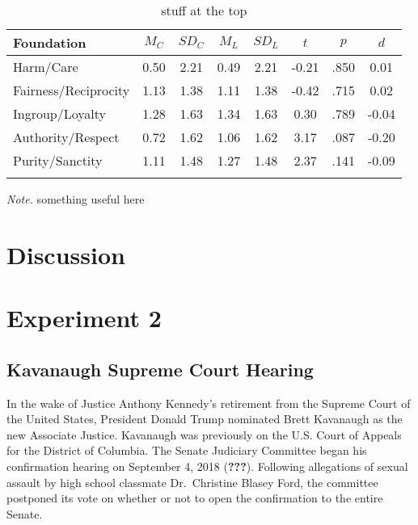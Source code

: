 \documentclass[,man]{apa6}
\theoremstyle{definition}
\theoremstyle{definition}
\theoremstyle{definition}
\theoremstyle{remark}
\begin{document}
\begin{table}[tbp]
\begin{center}
\begin{threeparttable}
\caption{\label{tab:exp1-table}stuff at the top}
\begin{tabular}{lccccccc}
\toprule
Foundation & $M_C$ & $SD_C$ & $M_L$ & $SD_L$ & $t$ & $p$ & $d$\\
\midrule
Harm/Care & 0.50 & 2.21 & 0.49 & 2.21 & -0.21 & .850 & 0.01\\
Fairness/Reciprocity & 1.13 & 1.38 & 1.11 & 1.38 & -0.42 & .715 & 0.02\\
Ingroup/Loyalty & 1.28 & 1.63 & 1.34 & 1.63 & 0.30 & .789 & -0.04\\
Authority/Respect & 0.72 & 1.62 & 1.06 & 1.62 & 3.17 & .087 & -0.20\\
Purity/Sanctity & 1.11 & 1.48 & 1.27 & 1.48 & 2.37 & .141 & -0.09\\
\bottomrule
\addlinespace
\end{tabular}
\begin{tablenotes}[para]
\normalsize{\textit{Note.} something useful here}
\end{tablenotes}
\end{threeparttable}
\end{center}
\end{table}

\hypertarget{discussion}{%
\section{Discussion}\label{discussion}}

\hypertarget{experiment-2}{%
\section{Experiment 2}\label{experiment-2}}

\hypertarget{kavanaugh-supreme-court-hearing}{%
\subsection{Kavanaugh Supreme Court
Hearing}\label{kavanaugh-supreme-court-hearing}}

In the wake of Justice Anthony Kennedy's retirement from the Supreme
Court of the United States, President Donald Trump nominated Brett
Kavanaugh as the new Associate Justice. Kavanaugh was previously on the
U.S. Court of Appeals for the District of Columbia. The Senate Judiciary
Committee began his confirmation hearing on September 4, 2018
({\textbf{???}}). Following allegations of sexual assault by high school
classmate Dr.~Christine Blasey Ford, the committee postponed its vote on
whether or not to open the confirmation to the entire Senate.
\end{document}
